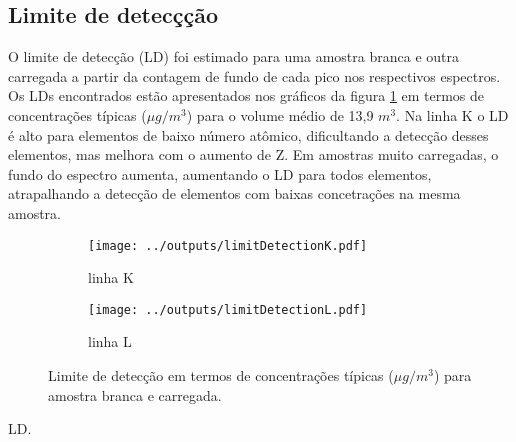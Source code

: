 \subsection{Limite de detecçção}

O limite de detecção (LD) foi estimado para uma amostra branca e outra carregada
a partir da contagem de fundo de cada pico nos respectivos espectros.
Os LDs encontrados estão apresentados nos gráficos da figura \ref{table:ld} 
em termos de concentrações típicas ($\mu g / m^3$) para o volume médio 
de 13,9 $m^3$. Na linha K o LD é alto para elementos de baixo número atômico, 
dificultando a detecção desses elementos, mas melhora com o aumento de Z. 
Em amostras muito carregadas, o fundo do espectro aumenta, aumentando o LD para 
todos elementos, atrapalhando a detecção de elementos com baixas concetrações
na mesma amostra. 

\begin{figure}[H]
  \begin{subfigure}[b]{0.5\textwidth}
    \texttt{[image: ../outputs/limitDetectionK.pdf]}
    \caption{linha K}
  \end{subfigure}%
  \begin{subfigure}[b]{0.5\textwidth}
    \texttt{[image: ../outputs/limitDetectionL.pdf]}
    \caption{linha L}
  \end{subfigure}
  \caption{Limite de detecção em termos de concentrações típicas 
           ($\mu g / m^3$) para amostra branca e carregada.
           \label{table:ld}}
\end{figure}

\begin{table}[H]
  \centering
  
  \caption{LD. \label{table:LD}}
\end{table}
